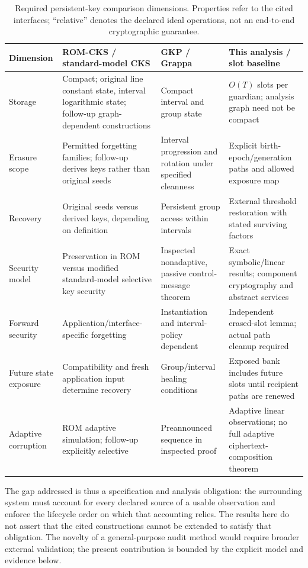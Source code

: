 \documentclass[pdflatex,sn-mathphys-num]{sn-jnl}
\theoremstyle{plain}
\theoremstyle{definition}
\begin{document}
\begin{table}[htbp]
\caption{Required persistent-key comparison dimensions. Properties refer to the cited interfaces; ``relative'' denotes the declared ideal operations, not an end-to-end cryptographic guarantee.}\label{tab:comparison}
\centering\footnotesize
\begin{tabularx}{\linewidth}{@{}p{.20\linewidth}YYY@{}}\toprule
Dimension & ROM-CKS / standard-model CKS & GKP / Grappa & This analysis / slot baseline\\\midrule
Storage & Compact; original line constant state, interval logarithmic state; follow-up graph-dependent constructions & Compact interval and group state & $O(T)$ slots per guardian; analysis graph need not be compact\\
Erasure scope & Permitted forgetting families; follow-up derives keys rather than original seeds & Interval progression and rotation under specified cleanness & Explicit birth-epoch/generation paths and allowed exposure map\\
Recovery & Original seeds versus derived keys, depending on definition & Persistent group access within intervals & External threshold restoration with stated surviving factors\\
Security model & Preservation in ROM versus modified standard-model selective key security & Inspected nonadaptive, passive control-message theorem & Exact symbolic/linear results; component cryptography and abstract services\\
Forward security & Application/interface-specific forgetting & Instantiation and interval-policy dependent & Independent erased-slot lemma; actual path cleanup required\\
Future state exposure & Compatibility and fresh application input determine recovery & Group/interval healing conditions & Exposed bank includes future slots until recipient paths are renewed\\
Adaptive corruption & ROM adaptive simulation; follow-up explicitly selective & Preannounced sequence in inspected proof & Adaptive linear observations; no full adaptive ciphertext-composition theorem\\\bottomrule
\end{tabularx}
\end{table}

The gap addressed is thus a specification and analysis obligation: the surrounding system must account for every declared source of a usable observation and enforce the lifecycle order on which that accounting relies. The results here do not assert that the cited constructions cannot be extended to satisfy that obligation. The novelty of a general-purpose audit method would require broader external validation; the present contribution is bounded by the explicit model and evidence below.
\end{document}
